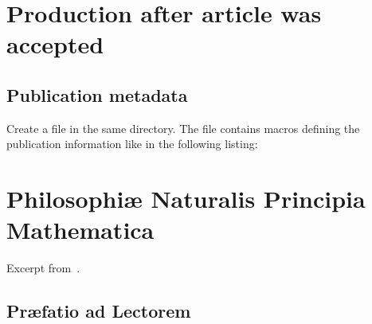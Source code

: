 \documentclass{ansarticle}
\begin{document}
\section{Production after article was accepted}
\subsection{Publication metadata}

Create a file  in the same directory. The file
contains macros defining the publication information like in the
following listing:



\section{Philosophi\ae{} Naturalis Principia Mathematica}




Excerpt from~\citet{Newton1687}.

\subsection{Pr\ae{}fatio ad Lectorem}
\end{document}
